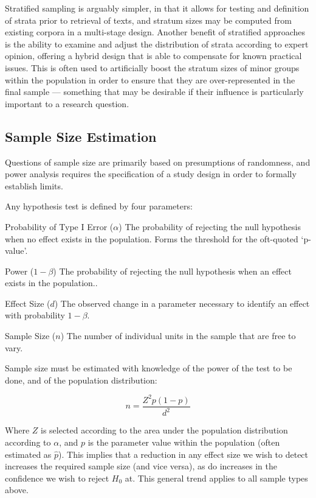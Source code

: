 Stratified sampling is arguably simpler, in that it allows for testing and definition of strata prior to retrieval of texts, and stratum sizes may be computed from existing corpora in a multi-stage design.  Another benefit of stratified approaches is the ability to examine and adjust the distribution of strata according to expert opinion, offering a hybrid design that is able to compensate for known practical issues.  This is often used to artificially boost the stratum sizes of minor groups within the population in order to ensure that they are over-represented in the final sample --- something that may be desirable if their influence is particularly important to a research question.



\subsection{Sample Size Estimation}
Questions of sample size are primarily based on presumptions of randomness, and power analysis requires the specification of a study design in order to formally establish limits.

Any hypothesis test is defined by four parameters\cite{ellis2010essential}:

\begin{itemizeTitle}
    \item[Probability of Type I Error ($\alpha$)] The probability of rejecting the null hypothesis when no effect exists in the population.  Forms the threshold for the oft-quoted `p-value'.
    \item[Power ($1 - \beta$)] The probability of rejecting the null hypothesis when an effect exists in the population..
    \item[Effect Size ($d$)] The observed change in a parameter necessary to identify an effect with probability $1 - \beta$.
    \item[Sample Size ($n$)] The number of individual units in the sample that are free to vary.
\end{itemizeTitle}

Sample size must be estimated with knowledge of the power of the test to be done, and of the population distribution:

$$
n = \frac{Z^2p(1-p)}{d^2}
$$

Where $Z$ is selected according to the area under the population distribution according to $\alpha$, and $p$ is the parameter value within the population (often estimated as $\hat{p}$).  This implies that a reduction in any effect size we wish to detect increases the required sample size (and vice versa), as do increases in the confidence we wish to reject $H_0$ at.  This general trend applies to all sample types above.

